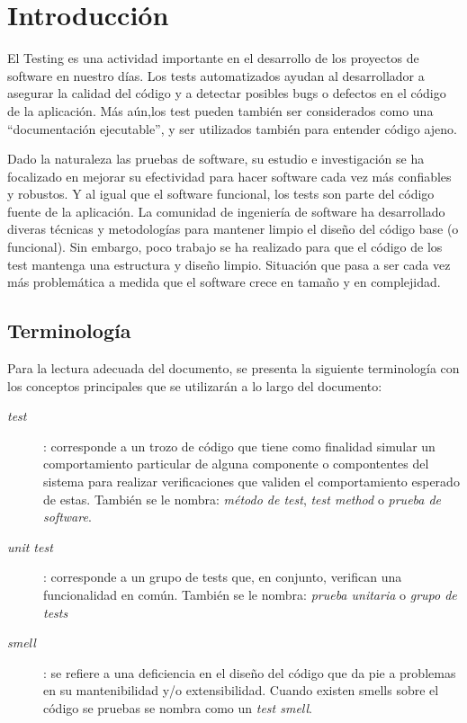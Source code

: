 \chapter{Introducción} 
\par El Testing es una actividad importante en el desarrollo de los proyectos de software en nuestro días. Los tests automatizados ayudan al desarrollador a asegurar la calidad del código y a detectar posibles bugs o defectos en el código de la aplicación. Más aún,los test pueden también ser considerados como  una ``documentación ejecutable'', y ser utilizados también para entender código ajeno.

\par Dado la naturaleza las pruebas de software, su estudio e investigación se ha focalizado en mejorar su efectividad para hacer software cada vez más confiables y robustos. Y al igual que el software funcional, los tests son parte del código fuente de la aplicación. La comunidad de ingeniería de software ha desarrollado diveras técnicas y metodologías para mantener limpio el diseño del código base (o funcional). Sin embargo, poco trabajo se ha realizado para que  el código de los test mantenga una estructura y diseño limpio. Situación que pasa a ser cada vez más problemática a medida que el software crece en tamaño y en complejidad.


\section{Terminología}

\par Para la lectura adecuada del documento, se presenta la siguiente terminología con los conceptos principales que se utilizarán a lo largo del documento:

\begin{description}
\item[\emph{test}]: corresponde a un trozo de código que tiene como finalidad simular un comportamiento particular de alguna componente o compontentes del sistema para realizar verificaciones que validen el comportamiento esperado de estas. También se le nombra: \emph{método de test}, \emph{test method} o \emph{prueba de software}.
\item[\emph{unit test}]: corresponde a un grupo de tests que, en conjunto, verifican una funcionalidad en común. También se le nombra: \emph{prueba unitaria} o \emph{grupo de tests}
\item[\emph{smell}]: se refiere a una deficiencia en el diseño del código que da pie a problemas en su mantenibilidad y/o extensibilidad. Cuando existen smells sobre el código se pruebas se nombra como un \emph{test smell}.
\end{description}

